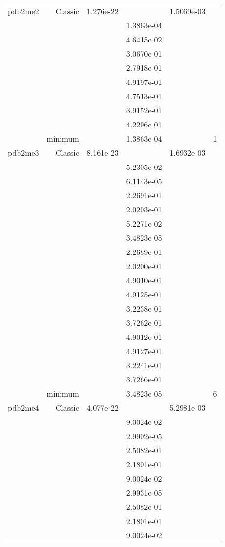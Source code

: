 \begin{xltabular}{\textwidth}{r|rS[table-format=1.3e+2]S[table-format=1.4e+2]S[table-format=1.4e+2]S[table-format=-1.5]}
pdb2me2 & Classic & 1.276e-22 &  & 1.5069e-03 & \\
&  &  & 1.3863e-04 & & \\
&  &  & 4.6415e-02 & & \\
&  &  & 3.0670e-01 & & \\
&  &  & 2.7918e-01 & & \\
&  &  & 4.9197e-01 & & \\
&  &  & 4.7513e-01 & & \\
&  &  & 3.9152e-01 & & \\
&  &  & 4.2296e-01 & & \\
& minimum &  & 1.3863e-04 & & 1 \\  \addlinespace
pdb2me3 & Classic & 8.161e-23 &  & 1.6932e-03 & \\
&  &  & 5.2305e-02 & & \\
&  &  & 6.1143e-05 & & \\
&  &  & 2.2691e-01 & & \\
&  &  & 2.0203e-01 & & \\
&  &  & 5.2271e-02 & & \\
&  &  & 3.4823e-05 & & \\
&  &  & 2.2689e-01 & & \\
&  &  & 2.0200e-01 & & \\
&  &  & 4.9010e-01 & & \\
&  &  & 4.9125e-01 & & \\
&  &  & 3.2238e-01 & & \\
&  &  & 3.7262e-01 & & \\
&  &  & 4.9012e-01 & & \\
&  &  & 4.9127e-01 & & \\
&  &  & 3.2241e-01 & & \\
&  &  & 3.7266e-01 & & \\
& minimum &  & 3.4823e-05 & & 6 \\  \addlinespace
pdb2me4 & Classic & 4.077e-22 &  & 5.2981e-03 & \\
&  &  & 9.0024e-02 & & \\
&  &  & 2.9902e-05 & & \\
&  &  & 2.5082e-01 & & \\
&  &  & 2.1801e-01 & & \\
&  &  & 9.0024e-02 & & \\
&  &  & 2.9931e-05 & & \\
&  &  & 2.5082e-01 & & \\
&  &  & 2.1801e-01 & & \\
&  &  & 9.0024e-02 & & \\

\end{xltabular}
